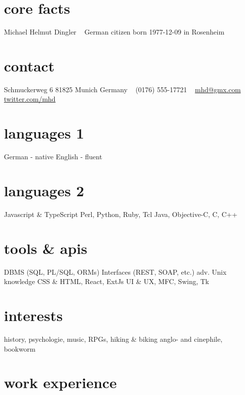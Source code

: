 \documentclass[]{friggeri-cv-a4}
\begin{document}


\begin{aside} %
\section{core facts}
Michael Helmut Dingler
~
German citizen
born 1977-12-09 in Rosenheim
\section{contact}
Schmuckerweg 6
81825 Munich
Germany
~
(0176) 555-17721
~
\href{mailto:mhd@gmx.com}{mhd@gmx.com}
\href{http://twitter.com/mhd}{twitter.com/mhd}
\section{languages 1}
German - native
English - fluent
\section{languages 2}
Javascript \& TypeScript
Perl, Python, Ruby, Tcl
Java, Objective-C, C, C++
\section{tools \& apis}
DBMS (SQL, PL/SQL, ORMs)
Interfaces (REST, SOAP, etc.)
adv. Unix knowledge
CSS \& HTML, React, ExtJs
UI \& UX, MFC, Swing, Tk
\section{interests}
history, psychologie,
music, RPGs,
hiking \& biking
anglo- and cinephile,
bookworm
\end{aside}


\section{work experience}

\end{document}
